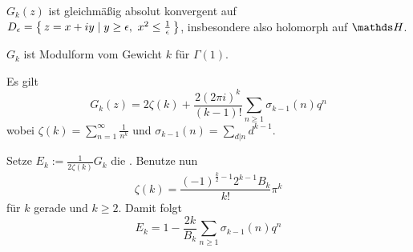 \begin{satz-list}
	\item $G_k(z)$ ist gleichmäßig absolut konvergent auf $D_\epsilon = \Set{ z=x+iy \mid y \geq \epsilon,\ x^2 \leq \frac{1}{\epsilon}}$, insbesondere also holomorph auf $\HH$.
	\item $G_k$ ist Modulform vom Gewicht $k$ für $\Gamma(1)$.
	\item Es gilt
	\[
		G_k(z) = 2\zeta(k) + \frac{2(2\pi i)^k}{(k-1)!} \sum_{n \geq 1} \sigma_{k-1}(n)q^n
	\]
	wobei $\zeta(k) = \sum_{n=1}^\infty \frac{1}{n^k}$ und $\sigma_{k-1}(n) = \sum_{d|n} d^{k-1}$.
	
	Setze $E_k := \frac{1}{2\zeta(k)} G_k$ die .
	Benutze nun
	\[
		\zeta(k) = \frac{(-1)^{\frac{k}{2}-1}2^{k-1} B_k}{k!} \pi^k
	\]
	für $k$ gerade und $k \geq 2$.
	Damit folgt
	\[
		E_k = 1 - \frac{2k}{B_k} \sum_{n \geq 1} \sigma_{k-1}(n)q^n
	\]
\end{satz-list}